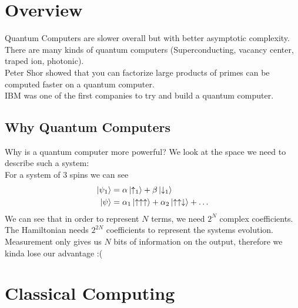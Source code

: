 \section{Overview}
Quantum Computers are slower overall but with better asymptotic complexity. \\
There are many kinds of quantum computers (Superconducting, vacancy center, traped ion, photonic). \\
Peter Shor showed that you can factorize large products of primes can be computed faster on a quantum computer. \\
IBM was one of the first companies to try and build a quantum computer. \\
\subsection{Why Quantum Computers}
Why is a quantum computer more powerful? We look at the space we need to describe such a system:\\
For a system of 3 spins we can see
\begin{align*}
	\ket{\psi_1} &= \alpha\ket{\uparrow_1} + \beta\ket{\downarrow_1} \\
	\ket{\psi} &= \alpha_1\ket{\uparrow\uparrow\uparrow} + \alpha_2\ket{\uparrow\uparrow\downarrow} + \ldots
\end{align*}
We can see that in order to represent $N$ terms, we need $2^N$ complex coefficients. The Hamiltonian needs $2^{2N}$ coefficients to represent the systems evolution. \\
Measurement only gives us $N$ bits of information on the output, therefore we kinda lose our advantage :(
\section{Classical Computing}

